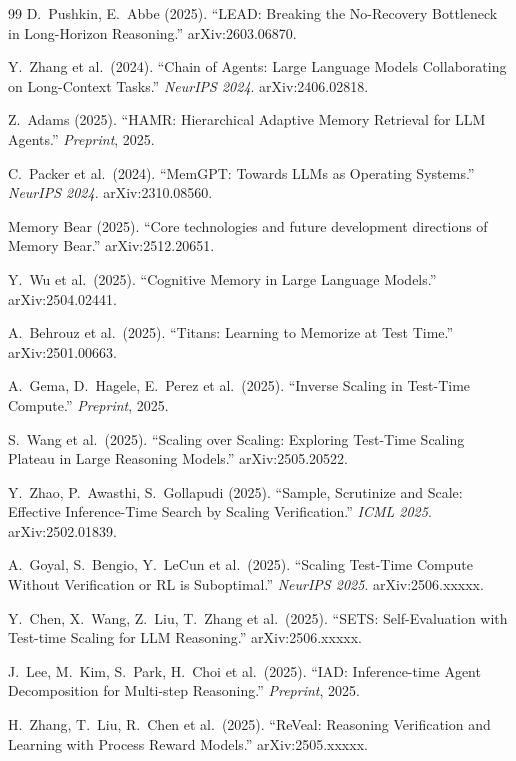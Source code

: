 \documentclass[11pt,a4paper]{ctexart}
\begin{document}
\begin{thebibliography}{99}
D.~Pushkin, E.~Abbe (2025).
``LEAD: Breaking the No-Recovery Bottleneck in Long-Horizon Reasoning.''
arXiv:2603.06870.

Y.~Zhang et al.\ (2024).
``Chain of Agents: Large Language Models Collaborating on Long-Context Tasks.''
\textit{NeurIPS 2024}. arXiv:2406.02818.

Z.~Adams (2025).
``HAMR: Hierarchical Adaptive Memory Retrieval for LLM Agents.''
\textit{Preprint}, 2025.

C.~Packer et al.\ (2024).
``MemGPT: Towards LLMs as Operating Systems.''
\textit{NeurIPS 2024}. arXiv:2310.08560.

Memory Bear (2025).
``Core technologies and future development directions of Memory Bear.''
arXiv:2512.20651.

Y.~Wu et al.\ (2025).
``Cognitive Memory in Large Language Models.''
arXiv:2504.02441.

A.~Behrouz et al.\ (2025).
``Titans: Learning to Memorize at Test Time.''
arXiv:2501.00663.

A.~Gema, D.~Hagele, E.~Perez et al.\ (2025).
``Inverse Scaling in Test-Time Compute.''
\textit{Preprint}, 2025.

S.~Wang et al.\ (2025).
``Scaling over Scaling: Exploring Test-Time Scaling Plateau in Large Reasoning Models.''
arXiv:2505.20522.

Y.~Zhao, P.~Awasthi, S.~Gollapudi (2025).
``Sample, Scrutinize and Scale: Effective Inference-Time Search by Scaling Verification.''
\textit{ICML 2025}. arXiv:2502.01839.

A.~Goyal, S.~Bengio, Y.~LeCun et al.\ (2025).
``Scaling Test-Time Compute Without Verification or RL is Suboptimal.''
\textit{NeurIPS 2025}. arXiv:2506.xxxxx.

Y.~Chen, X.~Wang, Z.~Liu, T.~Zhang et al.\ (2025).
``SETS: Self-Evaluation with Test-time Scaling for LLM Reasoning.''
arXiv:2506.xxxxx.

J.~Lee, M.~Kim, S.~Park, H.~Choi et al.\ (2025).
``IAD: Inference-time Agent Decomposition for Multi-step Reasoning.''
\textit{Preprint}, 2025.

H.~Zhang, T.~Liu, R.~Chen et al.\ (2025).
``ReVeal: Reasoning Verification and Learning with Process Reward Models.''
arXiv:2505.xxxxx.


\end{thebibliography}
\end{document}

